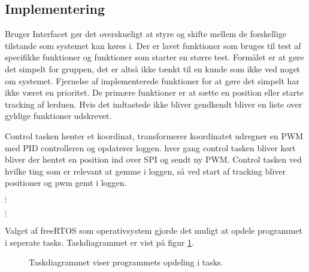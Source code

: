 \subsection{Implementering}
% 
% 
Bruger Interfacet gør det overskueligt at styre og skifte mellem de forskellige tilstande som systemet kan køres i.
Der er lavet funktioner som bruges til test af specifikke funktioner og funktioner som starter en større test.
Formålet er at gøre det simpelt for gruppen, det er altså ikke tænkt til en kunde som ikke ved noget om systemet.
Fjernelse af implementerede funktioner for at gøre det simpelt har ikke været en prioritet. 
De primære funktioner er at sætte en position eller starte tracking af lerduen.
Hvis det indtastede ikke bliver gendkendt bliver en liste over gyldige funktioner udskrevet.

Control tasken henter et koordinat, transformerer koordinatet udregner en PWM med PID controlleren og opdaterer loggen.
hver gang control tasken bliver kørt bliver der hentet en position ind over SPI og sendt ny PWM. 
Control tasken ved hvilke ting som er relevant at gemme i loggen, så ved start af tracking bliver positioner og pwm gemt i loggen.


\(\vdots\)

\(\vdots\)

    


Valget af freeRTOS som operativsystem gjorde det muligt at opdele programmet i seperate tasks. Taskdiagrammet er vist på figur \ref{fig:task_diagram}. 

\begin{figure}[!h]
\centering
\begin{tikzpicture}[node distance = 3.2cm]
	
\end{tikzpicture}
\caption[Task diagram]{Taskdiagrammet viser programmets opdeling i tasks.}
\label{fig:task_diagram}
\end{figure}

